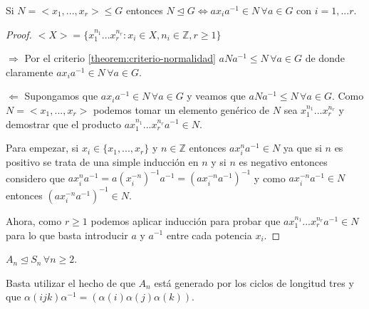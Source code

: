 \begin{nprop}
Si $N = <x_1,...,x_r>  \le G$ entonces $N \unlhd G \iff ax_ia^{-1} \in N \, \forall a \in G$ con $i = 1,...r$.
\end{nprop}
\begin{proof}
$<X> = \{x_1^{n_1}...x_r^{n_r}:x_i \in X,n_i \in \mathbb{Z},r \ge 1\}$

$\Rightarrow$ Por el criterio \ref{theorem:criterio-normalidad} $aNa^{-1} \le N \, \forall a \in G$ de donde claramente $ax_ia^{-1} \in N \, \forall a \in G$.

$\Leftarrow$ Supongamos que $ax_ia^{-1} \in N \, \forall a \in G$ y veamos que $aNa^{-1} \le N \, \forall a \in G$. Como $N = <x_1,...,x_r>$ podemos tomar un elemento genérico de $N$ sea $x_1^{n_1}...x_r^{n_r}$ y demostrar que el producto $ax_1^{n_1}...x_r^{n_r}a^{-1} \in N$.

Para empezar, si $x_i \in \{x_1,...,x_r\}$ y $n \in \mathbb{Z}$ entonces $ax_i^na^{-1} \in N$ ya que si $n$ es positivo se trata de una simple inducción en $n$ y si $n$ es negativo entonces considero que $ax_i^na^{-1} = a(x_i^{-n})^{-1}a^{-1} = (ax_i^{-n}a^{-1})^{-1}$ y como $ax_i^{-n}a^{-1} \in N$ entonces $(ax_i^{-n}a^{-1})^{-1} \in N$.

Ahora, como $r \ge 1$ podemos aplicar inducción para probar que $ax_1^{n_1}...x_r^{n_r}a^{-1} \in N$ para lo que basta introducir $a$ y $a^{-1}$ entre cada potencia $x_i$.
\end{proof}

\begin{ejemplo}
$A_n \trianglelefteq S_n \, \forall n \geq 2$.

Basta utilizar el hecho de que $A_n$ está generado por los ciclos de longitud tres y que $\alpha (ijk) \alpha^{-1} = (\alpha(i)\alpha(j)\alpha(k))$.
\end{ejemplo}

